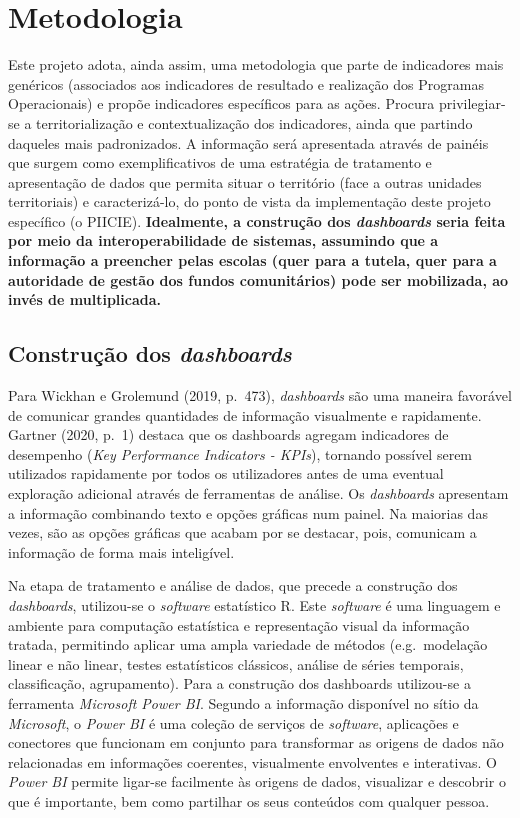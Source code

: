 \documentclass[
]{book}
\begin{document}
\hypertarget{metodologia}{%
\section{\texorpdfstring{\textbf{Metodologia}}{Metodologia}}\label{metodologia}}

Este projeto adota, ainda assim, uma metodologia que parte de indicadores mais genéricos (associados aos indicadores de resultado e realização dos Programas Operacionais) e propõe indicadores específicos para as ações. Procura privilegiar-se a territorialização e contextualização dos indicadores, ainda que partindo daqueles mais padronizados. A informação será apresentada através de painéis que surgem como exemplificativos de uma estratégia de tratamento e apresentação de dados que permita situar o território (face a outras unidades territoriais) e caracterizá-lo, do ponto de vista da implementação deste projeto específico (o PIICIE). \textbf{Idealmente, a construção dos \emph{dashboards} seria feita por meio da interoperabilidade de sistemas, assumindo que a informação a preencher pelas escolas (quer para a tutela, quer para a autoridade de gestão dos fundos comunitários) pode ser mobilizada, ao invés de multiplicada.}

\hypertarget{construuxe7uxe3o-dos-dashboards}{%
\subsection{\texorpdfstring{\textbf{Construção dos \emph{dashboards} }}{Construção dos dashboards }}\label{construuxe7uxe3o-dos-dashboards}}

Para Wickhan e Grolemund (2019, p.~473), \emph{dashboards} são uma maneira favorável de comunicar grandes quantidades de informação visualmente e rapidamente. Gartner (2020, p.~1) destaca que os dashboards agregam indicadores de desempenho (\emph{Key Performance Indicators - KPIs}), tornando possível serem utilizados rapidamente por todos os utilizadores antes de uma eventual exploração adicional através de ferramentas de análise. Os \emph{dashboards} apresentam a informação combinando texto e opções gráficas num painel. Na maiorias das vezes, são as opções gráficas que acabam por se destacar, pois, comunicam a informação de forma mais inteligível.

Na etapa de tratamento e análise de dados, que precede a construção dos \emph{dashboards}, utilizou-se o \emph{software} estatístico R. Este \emph{software} é uma linguagem e ambiente para computação estatística e representação visual da informação tratada, permitindo aplicar uma ampla variedade de métodos (e.g.~modelação linear e não linear, testes estatísticos clássicos, análise de séries temporais, classificação, agrupamento). Para a construção dos dashboards utilizou-se a ferramenta \emph{Microsoft Power BI}. Segundo a informação disponível no sítio da \emph{Microsoft}, o \emph{Power BI} é uma coleção de serviços de \emph{software}, aplicações e conectores que funcionam em conjunto para transformar as origens de dados não relacionadas em informações coerentes, visualmente envolventes e interativas. O \emph{Power BI} permite ligar-se facilmente às origens de dados, visualizar e descobrir o que é importante, bem como partilhar os seus conteúdos com qualquer pessoa.
\end{document}
